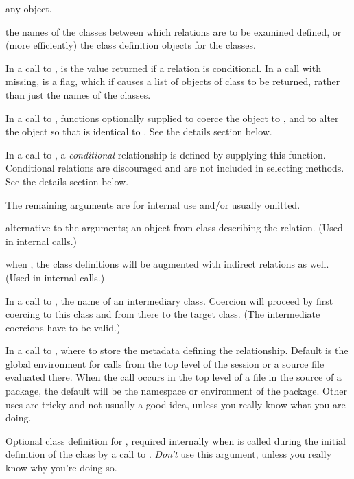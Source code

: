 \begin{Arguments}
\begin{ldescription}
\item[\code{object}] any \R{} object.
\item[\code{class1, class2}] 
the names of the classes between which  relations are to be
examined defined, or (more efficiently) the class definition
objects for the classes.

\item[\code{maybe, fullInfo}] 
In a call to ,  is the value returned if
a relation is conditional. In a call with  missing,
 is a flag, which if  causes a list of
objects of class  to be returned, rather than
just the names of the classes.

\item[\code{coerce, replace}] 
In a call to , functions optionally supplied to coerce the object to
, and to alter the object so that 
is identical to .  See the details section below.

\item[\code{test}] 
In a call to , a \emph{conditional} relationship is
defined by supplying this function.  Conditional relations are
discouraged and are not included in selecting methods.  See the details section below.

The remaining arguments are for internal use and/or usually omitted.

\item[\code{extensionObject}]  alternative to the  arguments; an object from class
 describing the relation.  (Used in internal calls.)

\item[\code{doComplete}] when , the class definitions will be
augmented with indirect relations as well.  (Used in internal calls.)
\item[\code{by}] 
In a call to , the name of an intermediary class.
Coercion will proceed by first coercing to this class and from there
to the target class.  (The intermediate coercions have to be valid.)
\item[\code{where}] 
In a call to , where to store the metadata defining the
relationship.  Default is the global environment for calls from the
top level of the session or a source file evaluated there.  When the
call occurs in the top level of a file in the source of a package,
the default will be the namespace or environment of the package.
Other uses are tricky and not usually a good idea, unless you really
know what you are doing.
\item[\code{classDef}] 
Optional class definition for  , required internally
when  is called during the initial definition of the
class by a call to . \emph{Don't} use this
argument, unless you really know why you're doing so.
\end{ldescription}
\end{Arguments}
